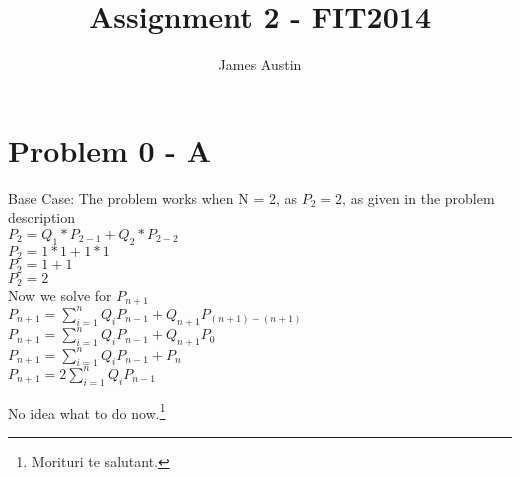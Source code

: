 \documentclass[11pt, oneside]{article}   	%
\title{Assignment 2 - FIT2014}
\author{James Austin}
\begin{document}
\maketitle

\section{Problem 0 - A}
Base Case: The problem works when N = 2, as $P_2 = 2$, as given in the problem description\\
$P_2 = Q_1*P_{2-1}+Q_2*P_{2-2}$\\
$P_2 = 1 * 1 + 1*1$\\
$P_2 = 1 + 1$\\
$P_2 = 2$\\
Now we solve for $P_{n+1}$\\
$P_{n+1} = \sum\limits_{i=1}^{n} Q_iP_{n-1}+Q_{n+1}P_{(n+1)-(n+1)}$\\
$P_{n+1} = \sum\limits_{i=1}^{n} Q_iP_{n-1}+Q_{n+1}P_{0}$\\
$P_{n+1} = \sum\limits_{i=1}^{n} Q_iP_{n-1}+P_n$\\
$P_{n+1} = 2 \sum\limits_{i=1}^{n} Q_iP_{n-1}$

No idea what to do now.\footnote{Morituri te salutant.}
\end{document}
